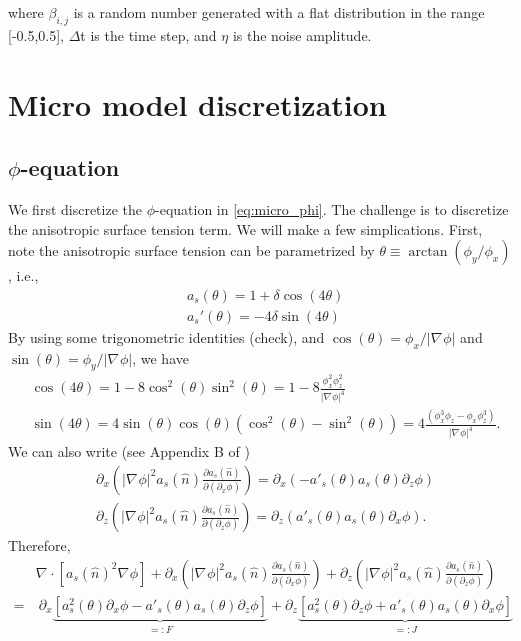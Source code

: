 \documentclass[a4paper,12pt]{article}
\renewcommand{\div}[1]{\nabla_{#1} \cdot}
\newcommand{\grad}[1]{\nabla_{#1}}
\begin{document}
where $\beta_{i,j}$ is a random number generated with a flat distribution in the range [-0.5,0.5], $\Delta$t is the time step, and $\eta$ is the noise amplitude.


\subsubsection{}
\section{Micro model discretization}
\subsection{$\phi$-equation}
We first discretize the $\phi$-equation in \cref{eq:micro_phi}. The challenge is to discretize the anisotropic surface tension term. We will make a few simplications. First, note the anisotropic surface tension can be parametrized by $\theta \equiv \arctan(\phi_y / \phi_x)$, i.e., 
\begin{align}
& a_s(\theta)=  1 + \delta \cos(4 \theta) \\
& a_s'(\theta) = -4 \delta \sin(4\theta) 
\end{align}
By using some trigonometric identities (check), and $\cos(\theta) = \phi_x / |\grad{} \phi|$ and  $\sin(\theta) = \phi_y / |\grad{} \phi|$, we have
\begin{align}
& \cos(4\theta) = 1-8\cos^2(\theta) \sin^2(\theta) = 1- 8 \frac{ \phi_x^2 \phi_z^2 }{|\grad{} \phi|^4} \\
& \sin(4\theta) = 4 \sin(\theta) \cos(\theta) ( \cos^2(\theta) - \sin^2(\theta)) = 4 \frac{(\phi_x^3 \phi_z - \phi_x \phi_z^3 )}{|\grad{} \phi|^4}.
\end{align}
We can also write (see Appendix B of \cite{Tourret2015})
\begin{align}
& \partial_x \left( |\grad{} \phi|^2 a_s(\hat{n}) \frac{\partial a_s(\hat{n})}{\partial (\partial_x \phi)}  \right) = \partial_x (-a'_s(\theta) a_s(\theta) \partial_z \phi ) \\
& \partial_z \left( |\grad{} \phi|^2 a_s(\hat{n}) \frac{\partial a_s(\hat{n})}{\partial (\partial_z \phi)}  \right) = 
\partial_z (a'_s(\theta) a_s(\theta) \partial_x \phi).
\end{align}
Therefore,
\begin{align}
 & \div{} [a_s(\hat{n})^2 \grad{} \phi] +  \partial_x \left( |\grad{} \phi|^2 a_s(\hat{n}) \frac{\partial a_s(\hat{n})}{\partial (\partial_x \phi)}  \right)  +
\partial_z \left( |\grad{} \phi|^2 a_s(\hat{n}) \frac{\partial a_s(\hat{n})}{\partial (\partial_z \phi)}  \right) \nonumber \\
= &  \  \partial_x  \underbrace{ \left[ a_s^2(\theta) \partial_x \phi - a'_s(\theta) a_s(\theta) \partial_z \phi \right]}_{=: F} + 
\partial_z \underbrace{ \left[ a_s^2(\theta) \partial_z \phi + a'_s(\theta) a_s(\theta) \partial_x \phi \right]}_{=: J}  
\label{eq:aniso_surf2}
\end{align}
\end{document}

